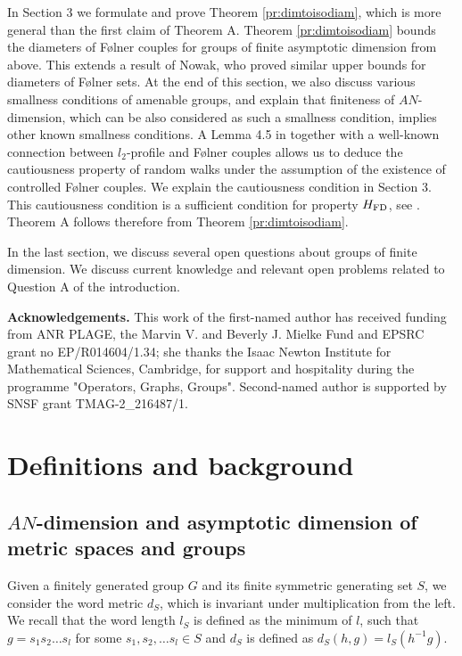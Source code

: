 \documentclass{amsart}
\numberwithin{figure}{section}
\theoremstyle{plain}
\theoremstyle{definition}
\begin{document}
In Section 3 we formulate and prove Theorem \ref{pr:dimtoisodiam},
which is more general than the first claim of Theorem A.
Theorem \ref{pr:dimtoisodiam} bounds the diameters of F{\o}lner couples for groups of finite asymptotic dimension from above. 
This extends a result of Nowak, who proved similar upper bounds for diameters of F{\o}lner sets. At the end of this section, we also discuss various smallness conditions of amenable groups, and explain that finiteness of $AN$-dimension, which can be also considered as such a smallness condition, implies other known smallness conditions. 
A Lemma 4.5 in
\cite{erschlerzheng} 
together with a well-known connection between $l_2$-profile and F{\o}lner couples
allows us to deduce the cautiousness property of random walks under the assumption of the existence of controlled F{\o}lner couples. 
We explain the cautiousness condition in Section 3. This cautiousness condition is a sufficient condition for property $H_{\rm FD}$, see \cite{erschlerozawa}.
Theorem A follows therefore from
Theorem \ref{pr:dimtoisodiam}.


In the last section, we discuss several open questions about groups of finite dimension. We discuss current knowledge and relevant open problems related to Question A of the introduction.

\vskip12pt
 {\bf Acknowledgements.} 
This work of the first-named author has received funding from  
ANR PLAGE, 
the Marvin V. and Beverly J. Mielke Fund and EPSRC grant no EP/R014604/1.34;
she thanks the Isaac Newton Institute for Mathematical Sciences, Cambridge, for support and hospitality during the programme "Operators, Graphs, Groups". 
Second-named author 
 is supported by SNSF grant TMAG-2\_216487\slash1.


\section{Definitions and background}
\subsection{$AN$-dimension and asymptotic dimension of metric spaces and groups }


Given a finitely generated group $G$ and its finite symmetric generating set $S$, we consider the word metric $d_S$, 
 which is invariant under multiplication from the left.
 We recall that  
 the word length $l_S$ is defined as  the minimum of $l$, such that
 $g=s_1 s_2 \dots s_l$ for some $s_1, s_2, \dots s_l\in S$ and  $d_S$ is defined as 
 $d_S(h, g)=l_S(h^{-1}g )$.
\end{document}
